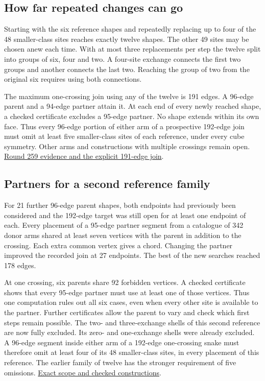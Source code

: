 \documentclass[11pt,a4paper]{article}
\begin{document}
\subsection{How far repeated changes can go}
Starting with the six reference shapes and repeatedly replacing up to
four of the 48 smaller-class sites reaches exactly twelve shapes.
The other 49 sites may be chosen anew each time. With at most three
replacements per step the twelve split into groups of six, four and
two. A four-site exchange connects the first two groups and another
connects the last two. Reaching the group of two from the original six
requires using both connections.

The maximum one-crossing join using any of the twelve is 191 edges.
A 96-edge parent and a 94-edge partner attain it. At each end of every
newly reached shape, a checked certificate excludes a 95-edge partner.
No shape extends within its own face. Thus every 96-edge portion of
either arm of a prospective 192-edge join must omit at least five
smaller-class sites of each reference, under every cube symmetry.
Other arms and constructions with multiple crossings remain open.
\href{https://github.com/hironaka-iori/Snake-in-the-box-in-9/tree/main/milestones/259-four-exchange-component}{Round 259 evidence and the explicit 191-edge join}.

\subsection{Partners for a second reference family}
For 21 further 96-edge parent shapes, both endpoints had previously
been considered and the 192-edge target was still open for at least
one endpoint of each. Every placement of a 95-edge partner segment
from a catalogue of 342 donor arms shared at least seven vertices
with the parent in addition to the crossing. Each extra common vertex
gives a chord. Changing the partner improved the recorded join at
27 endpoints. The best of the new searches reached 178 edges.

At one crossing, six parents share 92 forbidden vertices. A checked
certificate shows that every 95-edge partner must use at least one of
those vertices. Thus one computation rules out all six cases, even
when every other site is available to the partner. Further
certificates allow the parent to vary and check which first steps
remain possible.
The two- and three-exchange shells of this second reference are now fully excluded. Its zero- and one-exchange shells were already excluded. A 96-edge segment inside either arm of a 192-edge one-crossing snake must therefore omit at least four of its 48 smaller-class sites, in every placement of this reference. The earlier family of twelve has the stronger requirement of five omissions.
\href{https://github.com/hironaka-iori/Snake-in-the-box-in-9/tree/main/milestones/263-distant-family-certificates}{Exact scope and checked constructions}.
\end{document}
